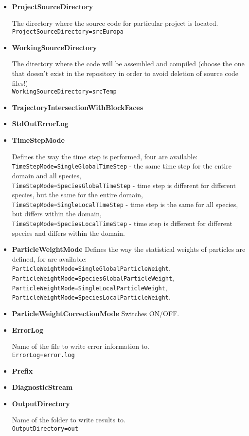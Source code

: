 \begin{itemize}
\item {\bf ProjectSourceDirectory}

The directory where the source code for particular project is located.\\
{\tt ProjectSourceDirectory=srcEuropa}

\item {\bf WorkingSourceDirectory}

The directory where the code will be assembled and compiled
(choose the one that doesn't exist in the repository in order
to avoid deletion of source code files!)\\
{\tt WorkingSourceDirectory=srcTemp}

\item {\bf TrajectoryIntersectionWithBlockFaces}

\item {\bf StdOutErrorLog}

\item {\bf TimeStepMode}

Defines the way the time step is performed, four are available:
\\{\tt TimeStepMode=SingleGlobalTimeStep} - the same time step
for the entire domain and all species,
\\{\tt TimeStepMode=SpeciesGlobalTimeStep} - time step is different for
different species, but the same for the entire domain,
\\{\tt TimeStepMode=SingleLocalTimeStep} - time step is the same for all species, 
but differs within the domain,
\\{\tt TimeStepMode=SpeciesLocalTimeStep} - time step is different for different
species and differs within the domain.

\item {\bf ParticleWeightMode}
Defines the way the statistical weights of particles are defined, for are available:
\\{\tt  ParticleWeightMode=SingleGlobalParticleWeight},
\\{\tt  ParticleWeightMode=SpeciesGlobalParticleWeight},
\\{\tt  ParticleWeightMode=SingleLocalParticleWeight},
\\{\tt  ParticleWeightMode=SpeciesLocalParticleWeight}.

\item {\bf ParticleWeightCorrectionMode}
Switches ON/OFF.

\item {\bf ErrorLog}

Name of the file to write error information to.
\\{\tt ErrorLog=error.log}

\item {\bf Prefix}

\item {\bf DiagnosticStream}

\item {\bf OutputDirectory}

Name of the folder to write results to.
\\{\tt OutputDirectory=out}


\end{itemize}

